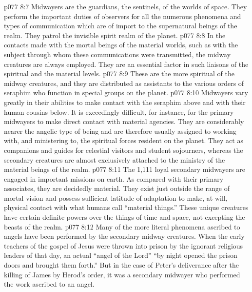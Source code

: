 \vs p077 8:7 \bibnobreakspace {} Midwayers are the guardians, the sentinels, of the worlds of space. They perform the important duties of observers for all the numerous phenomena and types of communication which are of import to the supernatural beings of the realm. They patrol the invisible spirit realm of the planet.
\vs p077 8:8 \bibnobreakspace {} In the contacts made with the mortal beings of the material worlds, such as with the subject through whom these communications were transmitted, the midway creatures are always employed. They are an essential factor in such liaisons of the spiritual and the material levels.
\vs p077 8:9 \bibnobreakspace {} These are the more spiritual of the midway creatures, and they are distributed as assistants to the various orders of seraphim who function in special groups on the planet.
\vs p077 8:10 \pc Midwayers vary greatly in their abilities to make contact with the seraphim above and with their human cousins below. It is exceedingly difficult, for instance, for the primary midwayers to make direct contact with material agencies. They are considerably nearer the angelic type of being and are therefore usually assigned to working with, and ministering to, the spiritual forces resident on the planet. They act as companions and guides for celestial visitors and student sojourners, whereas the secondary creatures are almost exclusively attached to the ministry of the material beings of the realm.
\vs p077 8:11 The 1,111 loyal secondary midwayers are engaged in important missions on earth. As compared with their primary associates, they are decidedly material. They exist just outside the range of mortal vision and possess sufficient latitude of adaptation to make, at will, physical contact with what humans call “material things.” These unique creatures have certain definite powers over the things of time and space, not excepting the beasts of the realm.
\vs p077 8:12 Many of the more literal phenomena ascribed to angels have been performed by the secondary midway creatures. When the early teachers of the gospel of Jesus were thrown into prison by the ignorant religious leaders of that day, an actual “angel of the Lord” “by night opened the prison doors and brought them forth.” But in the case of Peter’s deliverance after the killing of James by Herod’s order, it was a secondary midwayer who performed the work ascribed to an angel.
